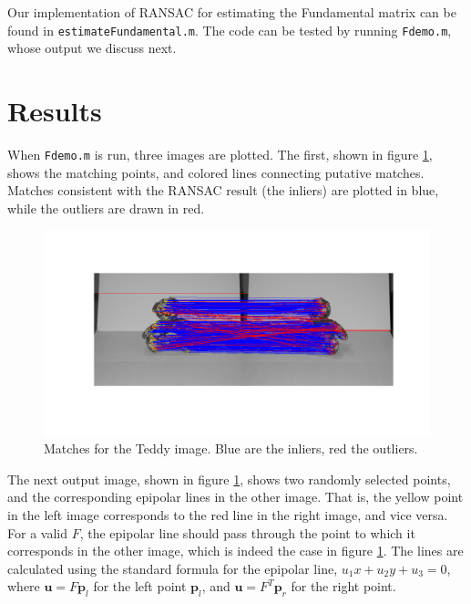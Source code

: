 \documentclass[a4paper,10pt]{article}
\begin{document}
Our implementation of RANSAC for estimating the Fundamental matrix can be found in \verb+estimateFundamental.m+.
The code can be tested by running \verb+Fdemo.m+, whose output we discuss next.

\section{Results}

When \verb+Fdemo.m+ is run, three images are plotted.
The first, shown in figure \ref{fig:matches}, shows the matching points, and colored lines connecting putative matches.
Matches consistent with the RANSAC result (the inliers) are plotted in blue, while the outliers are drawn in red.

\begin{figure}[h!]
  \centering
    \includegraphics[width=1\textwidth]{TeddyMatch}
  \caption{Matches for the Teddy image. Blue are the inliers, red the outliers.}
  \label{fig:matches}
\end{figure}
 
The next output image, shown in figure \ref{fig:matches}, shows two randomly selected points, and the corresponding epipolar lines in the other image.
That is, the yellow point in the left image corresponds to the red line in the right image, and vice versa.
For a valid $F$, the epipolar line should pass through the point to which it corresponds in the other image, which is indeed the case in figure \ref{fig:matches}.
The lines are calculated using the standard formula for the epipolar line, $u_1 x + u_2 y + u_3 = 0$,
where $\mathbf{u} = F \mathbf{p}_l$ for the left point $\mathbf{p}_l$, and $\mathbf{u} = F^T \mathbf{p}_r$ for the right point.
\end{document}
